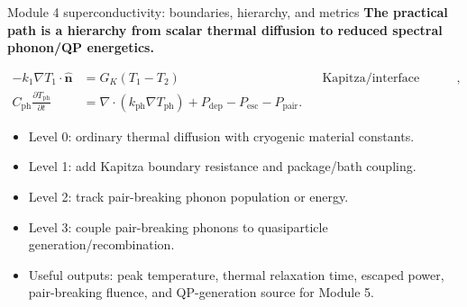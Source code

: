 \documentclass[aspectratio=169,10pt]{beamer}
\begin{document}
\begin{frame}{Module 4 superconductivity: boundaries, hierarchy, and metrics}
\footnotesize
\textbf{The practical path is a hierarchy from scalar thermal diffusion to reduced spectral phonon/QP energetics.}

\vspace{-0.15em}
\begin{align*}
-k_1\nabla T_1\cdot\hat{\mathbf n}&=G_K(T_1-T_2) &&\text{Kapitza/interface boundary},\\[-0.05em]
C_{\mathrm{ph}}\frac{\partial T_{\mathrm{ph}}}{\partial t}
&=\nabla\cdot(k_{\mathrm{ph}}\nabla T_{\mathrm{ph}})+P_{\mathrm{dep}}-P_{\mathrm{esc}}-P_{\mathrm{pair}}.
\end{align*}

\vspace{-0.25em}
\begin{itemize}
    \item Level 0: ordinary thermal diffusion with cryogenic material constants.
    \item Level 1: add Kapitza boundary resistance and package/bath coupling.
    \item Level 2: track pair-breaking phonon population or energy.
    \item Level 3: couple pair-breaking phonons to quasiparticle generation/recombination.
    \item Useful outputs: peak temperature, thermal relaxation time, escaped power, pair-breaking fluence, and QP-generation source for Module 5.
\end{itemize}
\end{frame}
\end{document}
